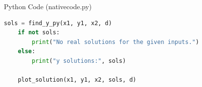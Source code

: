 \documentclass{beamer}
\begin{document}
\begin{frame}[fragile]{Python Code (nativecode.py)}
\begin{lstlisting}[language=Python]
    sols = find_y_py(x1, y1, x2, d)
    if not sols:
        print("No real solutions for the given inputs.")
    else:
        print("y solutions:", sols)

    plot_solution(x1, y1, x2, sols, d)
\end{lstlisting}
\end{frame}
\end{document}
